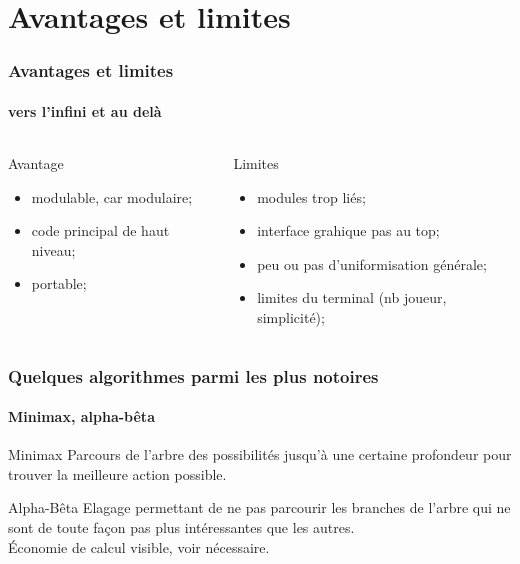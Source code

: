 \documentclass{beamer}
\begin{document}
    \section{Avantages et limites}
    \begin{frame}
    \frametitle{Avantages et limites}
    \framesubtitle{vers l'infini et au delà}
        \begin{columns}[c] %
            \begin{column}{5.5cm} %
                \begin{exampleblock}{Avantage}
                    \begin{itemize}
                        \item modulable, car modulaire;
                        \item code principal de haut niveau;
                        \item portable;
                    \end{itemize}
                \end{exampleblock}
            \end{column}
            \begin{column}{5.5cm} %
                \begin{alertblock}{Limites}
                    \begin{itemize}
                        \item modules trop liés;
                        \item interface grahique pas au top; 
                        \item peu ou pas d'uniformisation générale;
                        \item limites du terminal (nb joueur, simplicité);
                    \end{itemize}
                \end{alertblock}
            \end{column}
        \end{columns}
    \end{frame}


    \begin{frame}
    \frametitle{Quelques algorithmes parmi les plus notoires}
    \framesubtitle{Minimax, alpha-bêta}
        \begin{block}{Minimax}
            Parcours de l'arbre des possibilités jusqu'à une certaine profondeur pour trouver la meilleure action possible.
        \end{block}
        \begin{block}{Alpha-Bêta}
            Elagage permettant de ne pas parcourir les branches de l'arbre qui ne sont de toute façon pas plus intéressantes que les autres.\\
            Économie de calcul visible, voir nécessaire.
        \end{block}
    \end{frame}
\end{document}
